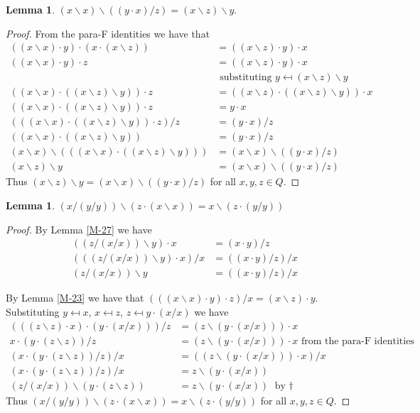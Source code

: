 \documentclass[12pt, twoside, openright]{report}
\theoremstyle{definition}
\newtheorem{lem}[thm]{Lemma}
\newcommand{\ldv}{\backslash}       %
\newcommand{\rdv}{/}                %
\begin{document}
\begin{lem}\label{M-36}
  $(x\ldv x)\ldv((y\cdot x)/z) = (x\ldv z)\ldv y$.
\end{lem}

\begin{proof}
  From the para-F identities we have that
  \begin{align*}
    ((x\ldv x)\cdot y)\cdot (x\cdot (x\ldv z)) &= ((x\ldv z)\cdot y)\cdot x\\
    ((x\ldv x)\cdot y)\cdot z &= ((x\ldv z)\cdot y)\cdot x\\
    &\text{ substituting $y \mapsfrom (x\ldv z)\ldv y$}\\
    ((x\ldv x)\cdot ((x\ldv z)\ldv y))\cdot z &= ((x\ldv z)\cdot ((x\ldv z)\ldv y))\cdot x\\
    ((x\ldv x)\cdot ((x\ldv z)\ldv y))\cdot z &=  y\cdot x\\
    (((x\ldv x)\cdot ((x\ldv z)\ldv y))\cdot z)/z &=  (y\cdot x)/z\\
    ((x\ldv x)\cdot ((x\ldv z)\ldv y)) &=  (y\cdot x)/z\\
    (x\ldv x)\ldv(((x\ldv x)\cdot ((x\ldv z)\ldv y))) &=  (x\ldv x)\ldv((y\cdot x)/z)\\
    (x\ldv z)\ldv y &= (x\ldv x)\ldv((y\cdot x)/z)
  \end{align*}
  Thus $(x\ldv z)\ldv y = (x\ldv x)\ldv((y\cdot x)/z)$ for all $x, y, z\in Q$.
\end{proof}

\begin{lem}\label{M-38}
  $(x/(y/y))\ldv (z\cdot(x\ldv x)) = x\ldv(z\cdot (y/y))$
\end{lem}

\begin{proof}
  By Lemma \ref{M-27} we have
  \begin{align*}
    ((z/(x/x))\ldv y)\cdot x &= (x\cdot y)/z\\
    (((z/(x/x))\ldv y)\cdot x)/x &= ((x\cdot y)/z)/x\\
    (z/(x/x))\ldv y &= ((x\cdot y)/z)/x \tag{$\dagger$}
  \end{align*}

  By Lemma \ref{M-23} we have that $(((x\ldv x)\cdot y)\cdot z)/x = (x\ldv z)\cdot y$.
    Substituting $y \mapsfrom x$, $x \mapsfrom z$, $z \mapsfrom y\cdot (x/x)$ we have
  \begin{align*}
    (((z\ldv z)\cdot x)\cdot (y\cdot(x/x)))/z &= (z\ldv (y\cdot (x/x)))\cdot x\\
    x\cdot (y\cdot(z\ldv z))/z &= (z\ldv(y\cdot(x/x)))\cdot x\text{ from the para-F identities}\\
    (x\cdot (y\cdot(z\ldv z))/z)/x &= ((z\ldv(y\cdot(x/x)))\cdot x)/x\\
    (x\cdot (y\cdot(z\ldv z))/z)/x &= z\ldv(y\cdot(x/x))\\
    (z/(x\rdv x))\ldv(y\cdot(z\ldv z)) &= z\ldv(y\cdot (x/x))\text{ by $\dagger$}
  \end{align*}
  Thus $(x/(y/y))\ldv (z\cdot(x\ldv x)) = x\ldv(z\cdot (y/y))$ for all $x, y, z\in Q$.
\end{proof}
\end{document}
